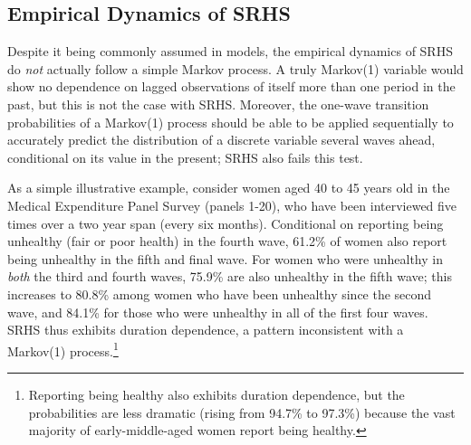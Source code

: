 \documentclass[12pt,pdftex,letterpaper]{article}
\begin{document}
\subsection{Empirical Dynamics of SRHS}

Despite it being commonly assumed in models, the empirical dynamics of SRHS do \textit{not} actually follow a simple Markov process. A truly Markov(1) variable would show no dependence on lagged observations of itself more than one period in the past, but this is not the case with SRHS.  Moreover, the one-wave transition probabilities of a Markov(1) process should be able to be applied sequentially to accurately predict the distribution of a discrete variable several waves ahead, conditional on its value in the present; SRHS also fails this test.

As a simple illustrative example, consider women aged 40 to 45 years old in the Medical Expenditure Panel Survey (panels 1-20), who have been interviewed five times over a two year span (every six months).  Conditional on reporting being unhealthy (fair or poor health) in the fourth wave, 61.2\% of women also report being unhealthy in the fifth and final wave.  For women who were unhealthy in \textit{both} the third and fourth waves, 75.9\% are also unhealthy in the fifth wave; this increases to 80.8\% among women who have been unhealthy since the second wave, and 84.1\% for those who were unhealthy in all of the first four waves.  SRHS thus exhibits duration dependence, a pattern inconsistent with a Markov(1) process.\footnote{Reporting being  healthy also exhibits duration dependence, but the probabilities are less dramatic (rising from 94.7\% to 97.3\%) because the vast majority of early-middle-aged women report being healthy.}
\end{document}
